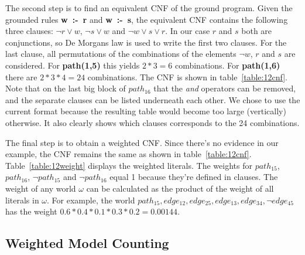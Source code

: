 The second step is to find an equivalent CNF of the ground program. Given the grounded rules \mbox{\textbf{w :- r}} and \mbox{\textbf{w :- s}}, the equivalent CNF contains the following three clauses: $\neg r \lor w$, $\neg s \lor w$ and $\neg w \lor s \lor r$. In our case $r$ and $s$ both are conjunctions, so De Morgans law is used to write the first two clauses. For the last clause, all permutations of the combinations of the elements $\neg w$, $r$ and $s$ are considered. For \textbf{path(1,5)} this yields $2*3 = 6$ combinations. For \textbf{path(1,6)} there are $2*3*4 = 24$ combinations. The CNF is shown in table~\ref{table:12cnf}. Note that on the last big block of $path_{16}$ that the \textit{and} operators can be removed, and the separate clauses can be listed underneath each other. We chose to use the current format because the resulting table would become too large (vertically) otherwise. It also clearly shows which clauses corresponds to the 24 combinations.



The final step is to obtain a weighted CNF. Since there's no evidence in our example, the CNF remains the same as shown in table~\ref{table:12cnf}. Table~\ref{table:12weight} displays the weighted literals. The weights for $path_{15}$, $path_{16}$, $\neg path_{15}$ and $\neg path_{16}$ equal 1 because they're defined in clauses. The weight of any world $\omega$ can be calculated as the product of the weight of all literals in $\omega$. For example, the world ${path_{15}, edge_{12}, edge_{25}, edge_{13}, edge_{34}, \neg edge_{45}}$ has the weight $0.6*0.4*0.1*0.3*0.2 = 0.00144$.




\subsection{Weighted Model Counting}

